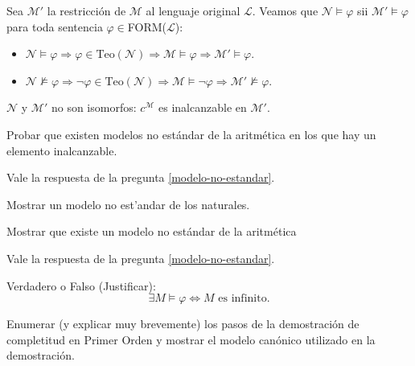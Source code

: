 \begin{questions}
\begin{solution}
  Sea $\mathcal{M}'$ la restricci\'on de $\mathcal{M}$ al lenguaje original $\mathcal{L}$. Veamos que $\mathcal{N}\vDash\varphi$ sii $\mathcal{M}'\vDash\varphi$ para toda sentencia $\varphi\in$FORM($\mathcal{L}$): 
  
  \begin{itemize}
   \item $\mathcal{N}\vDash\varphi \Rightarrow \varphi\in\text{Teo}(\mathcal{N}) \Rightarrow \mathcal{M}\vDash\varphi \Rightarrow \mathcal{M}'\vDash\varphi$.
   \item $\mathcal{N}\nvDash\varphi \Rightarrow \neg\varphi\in\text{Teo}(\mathcal{N}) \Rightarrow \mathcal{M}\vDash\neg\varphi \Rightarrow \mathcal{M}'\nvDash\varphi$.
  \end{itemize}
  
  $\mathcal{N}$ y $\mathcal{M}'$ no son isomorfos: $c^\mathcal{M}$ es inalcanzable en $\mathcal{M}'$.

\end{solution}

\question Probar que existen modelos no est\'andar de la aritm\'etica en los que hay un elemento inalcanzable. 


\begin{solution} 
Vale la respuesta de la pregunta \ref{modelo-no-estandar}.
\end{solution}

\question Mostrar un modelo no est'andar de los naturales. 

\question Mostrar que existe un modelo no est\'andar de  la aritm\'etica


\begin{solution} 
Vale la respuesta de la pregunta \ref{modelo-no-estandar}.
\end{solution}

\question Verdadero o Falso (Justificar):
  \begin{equation*}
    \exists M \vDash \varphi \Leftrightarrow M \text{ es infinito.}
  \end{equation*}

  
\question Enumerar (y explicar muy brevemente) los pasos de la demostraci\'on de completitud en Primer Orden y mostrar el modelo can\'onico utilizado en la demostraci\'on.


\begin{solution}


\end{solution}
\end{questions}
